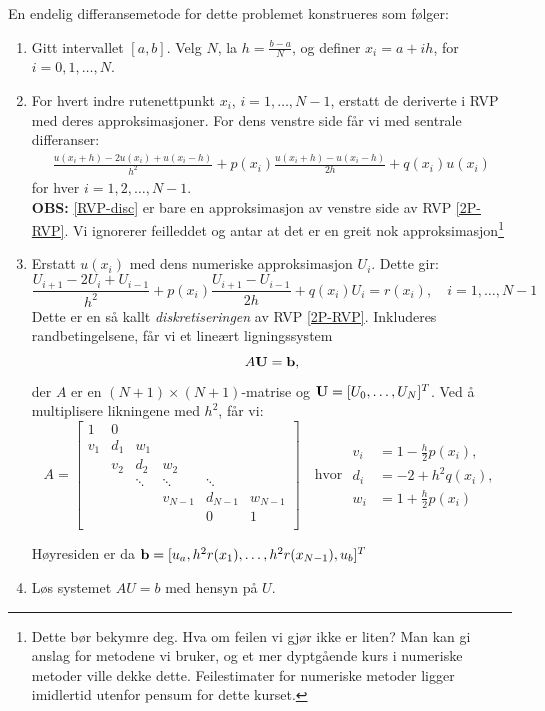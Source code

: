 En endelig differansemetode for dette problemet konstrueres som følger:

\begin{enumerate}
    \item Gitt intervallet \([a, b]\). Velg \( N \), la \( h = \frac{b - a}{N} \), og definer \( x_i = a + ih \), for \( i = 0, 1, \dots, N \).
    
    \item For hvert indre rutenettpunkt \( x_i \), \( i = 1, \dots, N - 1 \), erstatt de deriverte i RVP med deres approksimasjoner. For dens venstre side får vi med sentrale differanser:
    \begin{align}\label{RVP-disc}
    \frac{u(x_i + h) - 2u(x_i) + u(x_i - h)}{h^2} + p(x_i) \frac{u(x_i + h) - u(x_i - h)}{2h} + q(x_i) u(x_i)
    \end{align}
    for hver $i=1,2,\ldots,N-1$.\\
    \textbf{OBS:} \eqref{RVP-disc} er bare en approksimasjon av venstre side av RVP \eqref{2P-RVP}. Vi ignorerer feilleddet og antar at det er en greit nok approksimasjon\footnote{Dette bør bekymre deg. Hva om feilen vi gjør ikke er liten?
Man kan gi anslag for metodene vi bruker, og et mer dyptgående kurs i numeriske metoder ville dekke dette.
Feilestimater for numeriske metoder ligger imidlertid utenfor pensum for dette kurset.}
    \item Erstatt \( u(x_i) \) med dens numeriske approksimasjon \( U_i \). Dette gir:
    \[
    \frac{U_{i+1} - 2U_i + U_{i-1}}{h^2} + p(x_i)\frac{U_{i+1} - U_{i-1}}{2h} + q(x_i) U_i = r(x_i), \quad i = 1, \dots, N - 1
    \]
    Dette er en så kallt \emph{diskretiseringen} av RVP \eqref{2P-RVP}. Inkluderes randbetingelsene, får vi et lineært ligningssystem
    \[
    A\mathbf{U} = \mathbf{b},
    \]
    der \( A \) er en \((N+1) \times (N+1)\)-matrise og \( \mathbf{U} = [U_0, \dots, U_N]^T \). Ved å multiplisere likningene med \( h^2 \), får vi:
    \[
    A = \begin{bmatrix}
    1 & 0 & & & & \\
    v_1 & d_1 & w_1 & & & \\
    & v_2 & d_2 & w_2 & & \\
    & & \ddots & \ddots & \ddots & \\
    & & & v_{N-1} & d_{N-1} & w_{N-1} \\
    & & & & 0 & 1 \\
    \end{bmatrix} \quad \text{hvor } \begin{aligned} v_i &= 1 - \frac{h}{2}p(x_i),\\ d_i &= -2 + h^2q(x_i), \\ w_i &= 1 + \frac{h}{2}p(x_i) \end{aligned}
    \]

    Høyresiden er da $
    \mathbf{b} = [u_a, h^2 r(x_1), \dots, h^2 r(x_{N-1}), u_b]^T$
    \item Løs systemet \( AU = b \) med hensyn på \( U \).
\end{enumerate}


